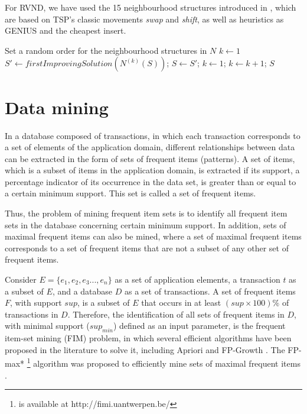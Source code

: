 \documentclass{singlecol-new}
\begin{document}

For RVND, we have used the 15 neighbourhood structures introduced in \citet{daSilva}, which are based on TSP's classic movements \textit{swap} and \textit{shift}, as well as heuristics as GENIUS and the cheapest insert.


\begin{algorithm}
	\caption{\hspace{-1mm}: RVND($S, N$)}
	\label{alg:vnd}
		{\footnotesize
	\begin{algorithmic}[1]		
		\STATE  Set a random order for the neighbourhood structures in $N$	
		\STATE $k \gets 1$
		\STATE $S' \gets firstImprovingSolution(N^{(k)}(S))$;
		\STATE $S \gets S'$;
		\STATE $k \gets 1$;
		\ELSE
		\STATE $k \gets k + 1$;
		\ENDIF
		\ENDWHILE
		\RETURN $S$
	\end{algorithmic}	
}
\end{algorithm}



\section{Data mining}

\label{sec:datamining}

In a database composed of transactions, in which each transaction corresponds to a set of elements of the application domain, different relationships between data can be extracted in the form of sets of frequent items (patterns). A set of items, which is a subset of items in the application domain, is extracted if its support, a percentage indicator of its occurrence in the data set, is greater than or equal to a certain minimum support. This set is called a set of frequent items.

Thus, the problem of mining frequent item sets is to identify all frequent item sets in the database concerning certain minimum support. In addition, sets of maximal frequent items can also be mined, where a set of maximal frequent items corresponds to a set of frequent items that are not a subset of any other set of frequent items.


Consider $ E = \{e_1, e_2, e_3 ..., e_n \} $ as a set of application elements, a transaction $ t $ as a subset of $ E $, and a database $ D $ as a set of transactions. A set of frequent items $ F $, with support $ sup $, is a subset of $ E $ that occurs in at least $ (sup \times 100) \% $ of transactions in $ D $. Therefore, the identification of all sets of frequent items in $ D $, with minimal support ($ sup_{min} $) defined as an input parameter, is the frequent item-set mining (FIM) problem, in which several efficient algorithms have been proposed in the literature to solve it, including Apriori \cite{agrawal1994fast} and FP-Growth \cite{han2000mining}. The FP-max* \footnote{is available at http://fimi.uantwerpen.be/} \cite{goethals04} algorithm was proposed to efficiently mine sets of maximal frequent items \cite{grahne2003efficiently}.
	
\end{document}

